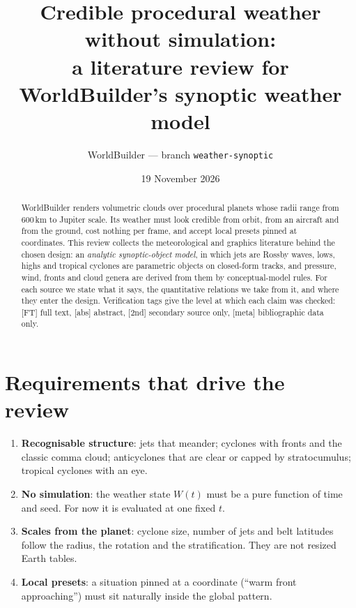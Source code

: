 \documentclass[11pt,a4paper]{article}
\title{Credible procedural weather without simulation:\\
a literature review for WorldBuilder's synoptic weather model}
\author{WorldBuilder --- branch \texttt{weather-synoptic}}
\date{19 November 2026}
\newcommand{\verif}[1]{\textsf{\small[#1]}}
\begin{document}
\maketitle

\begin{abstract}
WorldBuilder renders volumetric clouds over procedural planets whose radii range from
600\,km to Jupiter scale. Its weather must look credible from orbit, from an aircraft and
from the ground, cost nothing per frame, and accept local presets pinned at coordinates.
This review collects the meteorological and graphics literature behind the chosen design:
an \emph{analytic synoptic-object model}, in which jets are Rossby waves, lows, highs and
tropical cyclones are parametric objects on closed-form tracks, and pressure, wind, fronts
and cloud genera are derived from them by conceptual-model rules. For each source we state
what it says, the quantitative relations we take from it, and where they enter the design.
Verification tags give the level at which each claim was checked:
\verif{FT} full text, \verif{abs} abstract, \verif{2nd} secondary source only,
\verif{meta} bibliographic data only.
\end{abstract}

\tableofcontents

\section{Requirements that drive the review}
\begin{enumerate}
\item \textbf{Recognisable structure}: jets that meander; cyclones with fronts and the
  classic comma cloud; anticyclones that are clear or capped by stratocumulus; tropical
  cyclones with an eye.
\item \textbf{No simulation}: the weather state $W(t)$ must be a pure function of time and
  seed. For now it is evaluated at one fixed $t$.
\item \textbf{Scales from the planet}: cyclone size, number of jets and belt latitudes
  follow the radius, the rotation and the stratification. They are not resized Earth tables.
\item \textbf{Local presets}: a situation pinned at a coordinate (``warm front
  approaching'') must sit naturally inside the global pattern.
\end{enumerate}

\end{document}

